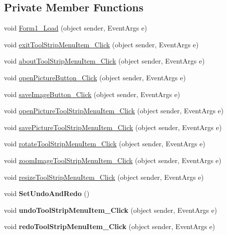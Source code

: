 \subsection*{Private Member Functions}
\begin{DoxyCompactItemize}
\item 
void \hyperlink{class_u_i_1_1_shopped_gui_ad9bcb5a3a89de53a6ef580bd806fae26}{Form1\_\-Load} (object sender, EventArgs e)
\item 
void \hyperlink{class_u_i_1_1_shopped_gui_a4c3239cc225d230bafb0cc53a9f49e2c}{exitToolStripMenuItem\_\-Click} (object sender, EventArgs e)
\item 
void \hyperlink{class_u_i_1_1_shopped_gui_a04958c8af963e508601e03e14bfb8bb8}{aboutToolStripMenuItem\_\-Click} (object sender, EventArgs e)
\item 
void \hyperlink{class_u_i_1_1_shopped_gui_a5a4be38d87e3d968e9336400e572b646}{openPictureButton\_\-Click} (object sender, EventArgs e)
\item 
void \hyperlink{class_u_i_1_1_shopped_gui_a205444f0fff14792394724b4eb22601d}{saveImageButton\_\-Click} (object sender, EventArgs e)
\item 
void \hyperlink{class_u_i_1_1_shopped_gui_a059988dec5a74fcc82ee2eb503d49118}{openPictureToolStripMenuItem\_\-Click} (object sender, EventArgs e)
\item 
void \hyperlink{class_u_i_1_1_shopped_gui_a79d60e553769283f7b9ec8af7a9d3dc1}{savePictureToolStripMenuItem\_\-Click} (object sender, EventArgs e)
\item 
void \hyperlink{class_u_i_1_1_shopped_gui_a8b4824c0552bcfe814bbf8437cb87ec2}{rotateToolStripMenuItem\_\-Click} (object sender, EventArgs e)
\item 
void \hyperlink{class_u_i_1_1_shopped_gui_a5f99b03c74d01734153873d6c35fbdf3}{zoomImageToolStripMenuItem\_\-Click} (object sender, EventArgs e)
\item 
void \hyperlink{class_u_i_1_1_shopped_gui_a05e2b57477f10f88b1ee06b6b5aa4d86}{resizeToolStripMenuItem\_\-Click} (object sender, EventArgs e)
\item 
\hypertarget{class_u_i_1_1_shopped_gui_a99e47a8b843bf190a7a0e3f8b3f5abb9}{
void {\bfseries SetUndoAndRedo} ()}
\label{class_u_i_1_1_shopped_gui_a99e47a8b843bf190a7a0e3f8b3f5abb9}

\item 
\hypertarget{class_u_i_1_1_shopped_gui_a167624483eae61dcbe7de755ad0549a5}{
void {\bfseries undoToolStripMenuItem\_\-Click} (object sender, EventArgs e)}
\label{class_u_i_1_1_shopped_gui_a167624483eae61dcbe7de755ad0549a5}

\item 
\hypertarget{class_u_i_1_1_shopped_gui_a5828d5deddf5b8453e01db469a1a6f83}{
void {\bfseries redoToolStripMenuItem\_\-Click} (object sender, EventArgs e)}
\label{class_u_i_1_1_shopped_gui_a5828d5deddf5b8453e01db469a1a6f83}

\end{DoxyCompactItemize}


